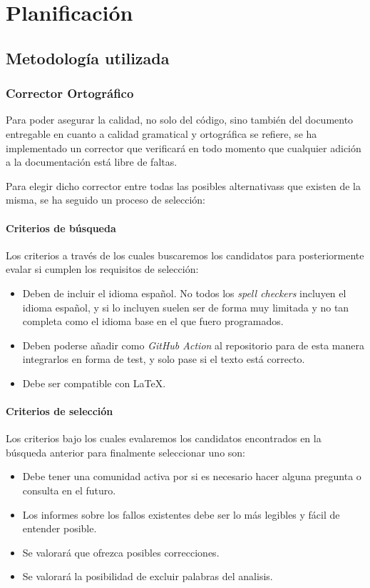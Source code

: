 \chapter{Planificación}

\section{Metodología utilizada}

\subsection{Corrector Ortográfico}
Para poder asegurar la calidad, no solo del código, sino también del documento
entregable en cuanto a calidad gramatical y ortográfica se refiere, se ha
implementado un corrector que verificará en todo momento que cualquier adición a
la documentación está libre de faltas. 

Para elegir dicho corrector entre todas las posibles alternativass que existen
de la misma, se ha seguido un proceso de selección:

\subsubsection{Criterios de búsqueda}

Los criterios a través de los cuales buscaremos los candidatos para
posteriormente evalar si cumplen los requisitos de selección:
\begin{itemize}
    \item Deben de incluir el idioma español. No todos los \emph{spell checkers}
    incluyen el idioma español, y si lo incluyen suelen ser de forma muy
    limitada y no tan completa como el idioma base en el que fuero programados.
    \item Deben poderse añadir como \emph{GitHub Action} al repositorio para de esta
    manera integrarlos en forma de test, y solo pase si el texto está correcto.
    \item Debe ser compatible con LaTeX.
\end{itemize}

\subsubsection{Criterios de selección}

Los criterios bajo los cuales evalaremos los candidatos encontrados en la
búsqueda anterior para finalmente seleccionar uno son:
\begin{itemize}
    \item Debe tener una comunidad activa por si es necesario hacer alguna
    pregunta o consulta en el futuro.
    \item Los informes sobre los fallos existentes debe ser lo más legibles y
    fácil de entender posible.
    \item Se valorará que ofrezca posibles correcciones.
    \item Se valorará la posibilidad de excluir palabras del analisis. 

\end{itemize}


